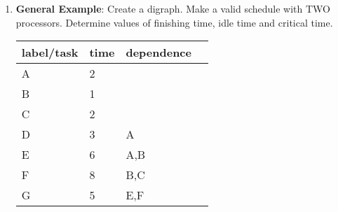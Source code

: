 \documentclass[12pt]{article}
\begin{document}
\begin{enumerate}
\item \textbf{General Example}: Create a digraph. Make a valid schedule with TWO processors. Determine values of finishing time, idle time and critical time.\\

\begin{tabular}{llll}
label/task&time&dependence\\
\hline
A&2&\\
B&1&\\
C&2&\\
D&3&A\\
E&6&A,B\\
F&8&B,C\\
G&5&E,F\\
\end{tabular}


\end{enumerate}
\end{document}
